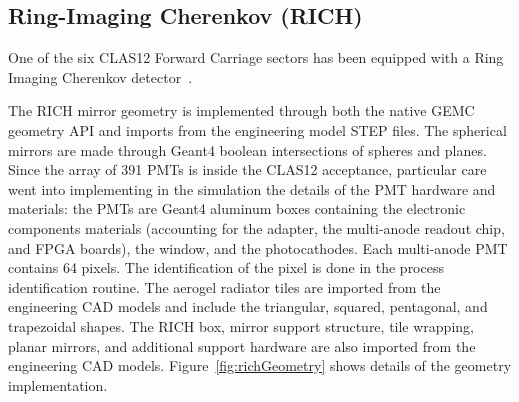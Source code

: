 \subsection{Ring-Imaging Cherenkov (RICH)}

One of the six CLAS12 Forward Carriage sectors has been equipped with a Ring Imaging Cherenkov detector~\cite{rich-nim}.

The RICH mirror geometry is implemented through both the native GEMC geometry API and imports from the engineering
model STEP files. The spherical mirrors are made through Geant4 boolean intersections of spheres and planes. Since the
array of 391 PMTs is inside the CLAS12 acceptance, particular care went into implementing in the simulation the details of
the PMT hardware and materials: the PMTs are Geant4 aluminum boxes containing the electronic components materials
(accounting for the adapter, the  multi-anode readout chip, and FPGA boards), the window, and the photocathodes. Each
multi-anode PMT contains 64 pixels. The identification of the pixel is done in the process identification routine. The aerogel
radiator tiles are imported from the engineering CAD models and include the triangular, squared, pentagonal, and
trapezoidal shapes. The RICH box, mirror support structure, tile wrapping, planar mirrors, and additional support
hardware are also imported from the engineering CAD models. Figure~\ref{fig:richGeometry} shows details of the
geometry implementation.

